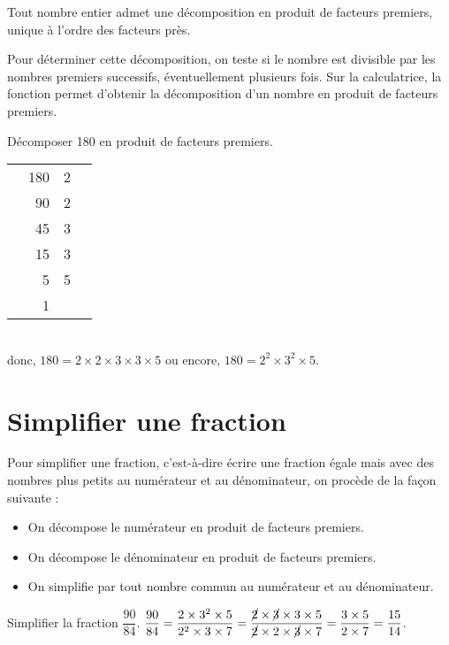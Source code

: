 \begin{propriete}
   Tout nombre entier admet une décomposition en produit de facteurs premiers, unique à l'ordre des facteurs près. 
\end{propriete}

\bigskip

Pour déterminer cette décomposition, on teste si le nombre est divisible par les nombres premiers successifs, éventuellement plusieurs fois. Sur la calculatrice, la fonction  \fg{} permet d'obtenir la décomposition d'un nombre en produit de facteurs premiers.

\begin{exemple}
   Décomposer 180 en produit de facteurs premiers.
   \correction
      {
      \begin{tabular}{C{2}r|ll}
         & 180 & 2 & \\
         & 90 & 2 & \\
         & 45 & 3 \qquad & \\
         & 15 & 3 & \\
         & 5 & 5 & \\
         & 1 & & \\
      \end{tabular}} \\
      donc, $180=2\times2\times3\times3\times5$ ou encore, $180=2^2\times3^2\times5$.
\end{exemple}

\section{Simplifier une fraction}

\begin{methode}
   Pour simplifier une fraction, c'est-à-dire écrire une fraction égale mais avec des nombres plus petits au numérateur et au dénominateur, on procède de la façon suivante :
   \begin{itemize}
      \item On décompose le numérateur en produit de facteurs premiers.
      \item On décompose le dénominateur en produit de facteurs premiers.
      \item On simplifie par tout nombre commun au numérateur et au dénominateur.
   \end{itemize}
   \exercice
   Simplifier la fraction $\dfrac{90}{84}$.
   \correction
   $\dfrac{90}{84} =\dfrac{2\times3^2\times5}{2^2\times3\times7} =\dfrac{\cancel{2}\times\cancel{3}\times3\times5}{\cancel{2}\times2\times\cancel{3}\times7} =\dfrac{3\times5}{2\times7} =\dfrac{15}{14}$.
\end{methode}


